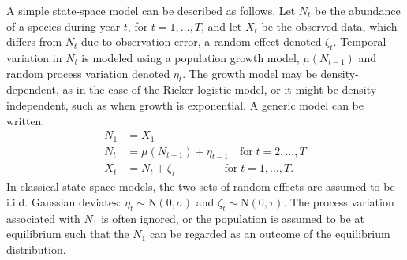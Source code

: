 \documentclass[12pt]{article}
\begin{document}
A simple state-space model can be described as follows.
Let $N_t$ be the abundance of a species during year $t$, for
$t=1,\hdots,T$, and let $X_t$ be
the observed data, which differs from $N_t$ due to observation error,
a random effect denoted $\zeta_t$. Temporal variation in $N_t$ is
modeled using a population growth model, $\mu(N_{t-1})$
and random process variation denoted $\eta_t$.
The growth model may be density-dependent, as in the case of the 
Ricker-logistic model, or it might be density-independent, such as when growth
is exponential.
A generic model can be written: %
\begin{subequations}
  \label{eq:ss1}
  \begin{align}
    N_1 &= X_1 \label{eq:ss1a} \\
N_t &= \mu(N_{t-1}) + \eta_{t-1} \quad \text{for} \;
t=2,\hdots,T \label{eq:ss1b} \\
X_t &= N_t + \zeta_t \qquad \qquad \;\, \text{for} \;
t=1,\hdots,T. \label{eq:ss1c}
  \end{align}
\end{subequations}
In classical
state-space models, the two sets of random effects
are assumed to be i.i.d. Gaussian deviates:
$\eta_t \sim \mathrm{N}(0, \sigma)$ and
$\zeta_t \sim \mathrm{N}(0, \tau)$. %
The process variation associated with $N_1$ is often ignored, or
the population is assumed to be at equilibrium such that the $N_1$ can
be regarded as an outcome of the equilibrium distribution.
\end{document}
